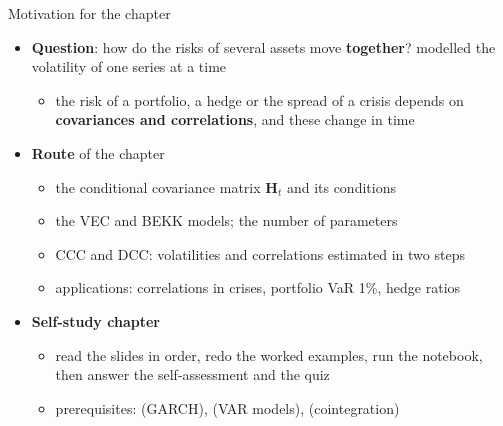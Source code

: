 \begin{frame}{Motivation for the chapter}
\itemsize{\small}
\begin{itemize}
    \item \textbf{Question}: how do the risks of several assets move \textbf{together}?  modelled the volatility of one series at a time
    \begin{itemize}
        \item the risk of a portfolio, a hedge or the spread of a crisis depends on \textbf{covariances and correlations}, and these change in time
    \end{itemize}
    \item \textbf{Route} of the chapter
    \begin{itemize}
        \item the conditional covariance matrix $\mathbf{H}_t$ and its conditions
        \item the VEC and BEKK models; the number of parameters
        \item CCC and DCC: volatilities and correlations estimated in two steps
        \item applications: correlations in crises, portfolio VaR 1\%, hedge ratios
    \end{itemize}
    \item \textbf{Self-study chapter}
    \begin{itemize}
        \item read the slides in order, redo the worked examples, run the notebook, then answer the self-assessment and the quiz
        \item prerequisites:  (GARCH),  (VAR models),  (cointegration)
    \end{itemize}
\end{itemize}
\end{frame}

